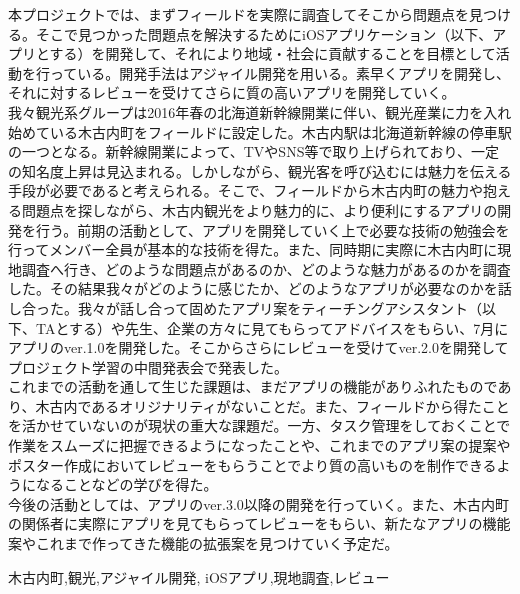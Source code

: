 \begin{jabstract}
\quad 本プロジェクトでは、まずフィールドを実際に調査してそこから問題点を見つける。そこで見つかった問題点を解決するためにiOSアプリケーション（以下、アプリとする）を開発して、それにより地域・社会に貢献することを目標として活動を行っている。開発手法はアジャイル開発を用いる。素早くアプリを開発し、それに対するレビューを受けてさらに質の高いアプリを開発していく。\\
\quad 我々観光系グループは2016年春の北海道新幹線開業に伴い、観光産業に力を入れ始めている木古内町をフィールドに設定した。木古内駅は北海道新幹線の停車駅の一つとなる。新幹線開業によって、TVやSNS等で取り上げられており、一定の知名度上昇は見込まれる。しかしながら、観光客を呼び込むには魅力を伝える手段が必要であると考えられる。そこで、フィールドから木古内町の魅力や抱える問題点を探しながら、木古内観光をより魅力的に、より便利にするアプリの開発を行う。前期の活動として、アプリを開発していく上で必要な技術の勉強会を行ってメンバー全員が基本的な技術を得た。また、同時期に実際に木古内町に現地調査へ行き、どのような問題点があるのか、どのような魅力があるのかを調査した。その結果我々がどのように感じたか、どのようなアプリが必要なのかを話し合った。我々が話し合って固めたアプリ案をティーチングアシスタント（以下、TAとする）や先生、企業の方々に見てもらってアドバイスをもらい、7月にアプリのver.1.0を開発した。そこからさらにレビューを受けてver.2.0を開発してプロジェクト学習の中間発表会で発表した。\\
\quad これまでの活動を通して生じた課題は、まだアプリの機能がありふれたものであり、木古内であるオリジナリティがないことだ。また、フィールドから得たことを活かせていないのが現状の重大な課題だ。一方、タスク管理をしておくことで作業をスムーズに把握できるようになったことや、これまでのアプリ案の提案やポスター作成においてレビューをもらうことでより質の高いものを制作できるようになることなどの学びを得た。\\
\quad 今後の活動としては、アプリのver.3.0以降の開発を行っていく。また、木古内町の関係者に実際にアプリを見てもらってレビューをもらい、新たなアプリの機能案やこれまで作ってきた機能の拡張案を見つけていく予定だ。

\begin{jkeyword}
木古内町,観光,アジャイル開発, iOSアプリ,現地調査,レビュー
\end{jkeyword}
\end{jabstract}

